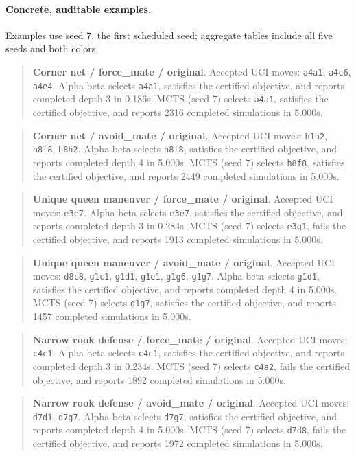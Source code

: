 \paragraph{Concrete, auditable examples.}
Examples use seed 7, the first scheduled seed; aggregate tables include all five seeds and both colors.
\begin{quote}\small\textbf{Corner net / force\_mate / original}. Accepted UCI moves: \texttt{a4a1}, \texttt{a4c6}, \texttt{a4e4}.
Alpha-beta selects \texttt{a4a1}, satisfies the certified objective, and reports completed depth 3 in 0.186s.
MCTS (seed 7) selects \texttt{a4a1}, satisfies the certified objective, and reports 2316 completed simulations in 5.000s.
\end{quote}
\begin{quote}\small\textbf{Corner net / avoid\_mate / original}. Accepted UCI moves: \texttt{h1h2}, \texttt{h8f8}, \texttt{h8h2}.
Alpha-beta selects \texttt{h8f8}, satisfies the certified objective, and reports completed depth 4 in 5.000s.
MCTS (seed 7) selects \texttt{h8f8}, satisfies the certified objective, and reports 2449 completed simulations in 5.000s.
\end{quote}
\begin{quote}\small\textbf{Unique queen maneuver / force\_mate / original}. Accepted UCI moves: \texttt{e3e7}.
Alpha-beta selects \texttt{e3e7}, satisfies the certified objective, and reports completed depth 3 in 0.284s.
MCTS (seed 7) selects \texttt{e3g1}, fails the certified objective, and reports 1913 completed simulations in 5.000s.
\end{quote}
\begin{quote}\small\textbf{Unique queen maneuver / avoid\_mate / original}. Accepted UCI moves: \texttt{d8c8}, \texttt{g1c1}, \texttt{g1d1}, \texttt{g1e1}, \texttt{g1g6}, \texttt{g1g7}.
Alpha-beta selects \texttt{g1d1}, satisfies the certified objective, and reports completed depth 4 in 5.000s.
MCTS (seed 7) selects \texttt{g1g7}, satisfies the certified objective, and reports 1457 completed simulations in 5.000s.
\end{quote}
\begin{quote}\small\textbf{Narrow rook defense / force\_mate / original}. Accepted UCI moves: \texttt{c4c1}.
Alpha-beta selects \texttt{c4c1}, satisfies the certified objective, and reports completed depth 3 in 0.234s.
MCTS (seed 7) selects \texttt{c4a2}, fails the certified objective, and reports 1892 completed simulations in 5.000s.
\end{quote}
\begin{quote}\small\textbf{Narrow rook defense / avoid\_mate / original}. Accepted UCI moves: \texttt{d7d1}, \texttt{d7g7}.
Alpha-beta selects \texttt{d7g7}, satisfies the certified objective, and reports completed depth 4 in 5.000s.
MCTS (seed 7) selects \texttt{d7d8}, fails the certified objective, and reports 1972 completed simulations in 5.000s.
\end{quote}
